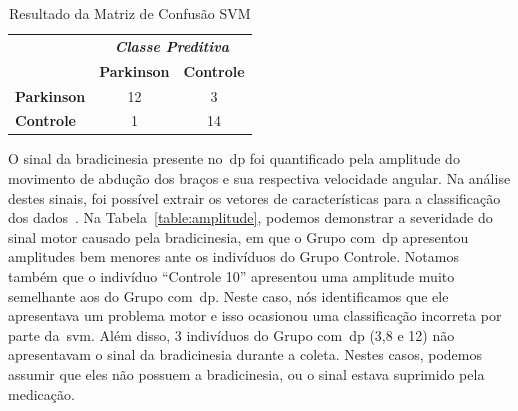 \begin{table}[!htbp] 
\caption{Resultado da Matriz de Confusão SVM}
\label{table:resultadomatrizconfusaosvm}
\centering
\begin{tabular}{l|c|c|}
\cline{2-3}
\multicolumn{1}{c}{}                         & \multicolumn{2}{|c|}{\textit{\textbf{Classe Preditiva}}} \\ \cline{2-3} 
                                             & \textbf{Parkinson}      & \textbf{Controle}         \\ \hline
\multicolumn{1}{|l|}{\textbf{Parkinson}} & 12       & 3           \\ \hline
\multicolumn{1}{|l|}{\textbf{Controle}}     & 1           & 14     \\ \hline
\end{tabular}

\end{table}

O sinal da bradicinesia presente no~\ac{dp} foi quantificado pela amplitude do movimento de abdução dos braços e sua respectiva velocidade angular. Na análise destes sinais, foi possível extrair os vetores de características para a classificação dos dados~\cite{kantardzic2011data}. Na Tabela~\ref{table:amplitude}, podemos demonstrar a severidade do sinal motor causado pela bradicinesia, em que o Grupo com~\ac{dp} apresentou amplitudes bem menores ante os indivíduos do Grupo Controle. Notamos também que o indivíduo ``Controle 10'' apresentou uma amplitude muito semelhante aos do Grupo com~\ac{dp}. Neste caso, nós identificamos que ele apresentava um problema motor e isso ocasionou uma classificação incorreta por parte da~\ac{svm}. Além disso, 3 indivíduos do Grupo com~\ac{dp} (3,8 e 12) não apresentavam o sinal da bradicinesia durante a coleta. Nestes casos, podemos assumir que eles não possuem a bradicinesia, ou o sinal estava suprimido pela medicação.



